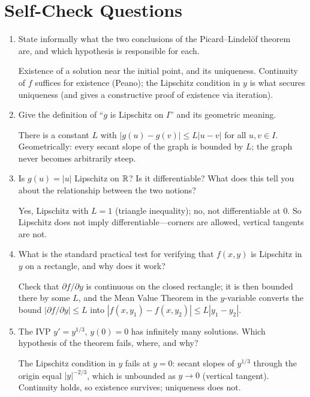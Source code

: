 \documentclass{essay}
\begin{document}
\section{Self-Check Questions}

\begin{enumerate}[leftmargin=*, itemsep=8pt]

  \item State informally what the two conclusions of the Picard--Lindel\"of theorem are, and which hypothesis is responsible for each.
    \begin{answer}
      Existence of a solution near the initial point, and its uniqueness. Continuity of \(f\) suffices for existence (Peano); the Lipschitz condition in \(y\) is what secures uniqueness (and gives a constructive proof of existence via iteration).
    \end{answer}

  \item Give the definition of ``\(g\) is Lipschitz on \(I\)'' and its geometric meaning.
    \begin{answer}
      There is a constant \(L\) with \(|g(u) - g(v)| \leq L|u-v|\) for all \(u, v \in I\). Geometrically: every secant slope of the graph is bounded by \(L\); the graph never becomes arbitrarily steep.
    \end{answer}

  \item Is \(g(u) = |u|\) Lipschitz on \(\mathbb{R}\)? Is it differentiable? What does this tell you about the relationship between the two notions?
    \begin{answer}
      Yes, Lipschitz with \(L = 1\) (triangle inequality); no, not differentiable at \(0\). So Lipschitz does not imply differentiable---corners are allowed, vertical tangents are not.
    \end{answer}

  \item What is the standard practical test for verifying that \(f(x,y)\) is Lipschitz in \(y\) on a rectangle, and why does it work?
    \begin{answer}
      Check that \(\partial f / \partial y\) is continuous on the closed rectangle; it is then bounded there by some \(L\), and the Mean Value Theorem in the \(y\)-variable converts the bound \(|\partial f/\partial y| \leq L\) into \(|f(x,y_{1}) - f(x,y_{2})| \leq L|y_{1} - y_{2}|\).
    \end{answer}

  \item The IVP \(y' = y^{1/3}\), \(y(0) = 0\) has infinitely many solutions. Which hypothesis of the theorem fails, where, and why?
    \begin{answer}
      The Lipschitz condition in \(y\) fails at \(y = 0\): secant slopes of \(y^{1/3}\) through the origin equal \(|y|^{-2/3}\), which is unbounded as \(y \to 0\) (vertical tangent). Continuity holds, so existence survives; uniqueness does not.
    \end{answer}


\end{enumerate}
\end{document}
